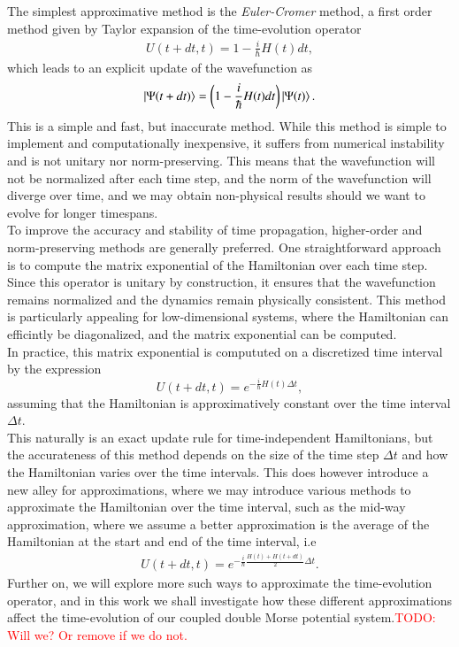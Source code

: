 \documentclass{subfiles}
\begin{document}
The simplest approximative method is the \emph{Euler-Cromer} method, a first order method given by Taylor expansion of the time-evolution operator
\begin{align}
    U(t + dt, t) = 1 - \frac{i}{\hbar}H(t)dt\label{eq:euler_cromer},
\end{align}
which leads to an explicit update of the wavefunction as 
\begin{align*}
    \ket{\Psi(t + dt)} = \bigg(1 - \frac{i}{\hbar}H(t)dt\bigg)\ket{\Psi(t)}.
\end{align*}
This is a simple and fast, but inaccurate method. While this method is simple to implement and computationally inexpensive, it suffers from numerical instability and is not unitary nor norm-preserving. This means that the wavefunction will not be normalized after each time step, and the norm of the wavefunction will diverge over time, and we may obtain non-physical results should we want to evolve for longer timespans. \\ 
To improve the accuracy and stability of time propagation, higher-order and norm-preserving methods are generally preferred. One straightforward approach is to compute the matrix exponential of the Hamiltonian over each time step. Since this operator is unitary by construction, it ensures that the wavefunction remains normalized and the dynamics remain physically consistent. This method is particularly appealing for low-dimensional systems, where the Hamiltonian can efficintly be diagonalized, and the matrix exponential can be computed. \\

In practice, this matrix exponential is compututed on a discretized time interval by the expression
\begin{equation}
    U(t + dt, t) = e^{-\frac{i}{\hbar}H(t)\Delta t}\label{eq:numerical_time_evolution_operator},
\end{equation}
assuming that the Hamiltonian is approximatively constant over the time interval $\Delta t$. \\

This naturally is an exact update rule for time-independent Hamiltonians, but the accurateness of this method depends on the size of the time step $\Delta t$ and how the Hamiltonian varies over the time intervals. This does however introduce a new alley for approximations, where we may introduce various methods to approximate the Hamiltonian over the time interval, such as the mid-way approximation, where we assume a better approximation is the average of the Hamiltonian at the start and end of the time interval, i.e
\begin{align*}
    U(t + dt, t) = e^{-\frac{i}{\hbar}\frac{H(t) + H(t + dt)}{2}\Delta t}.
\end{align*}
Further on, we will explore more such ways to approximate the time-evolution operator, and in this work we shall investigate how these different approximations affect the time-evolution of our coupled double Morse potential system.\textcolor{red}{TODO: Will we? Or remove if we do not.} \\ 
\end{document}
